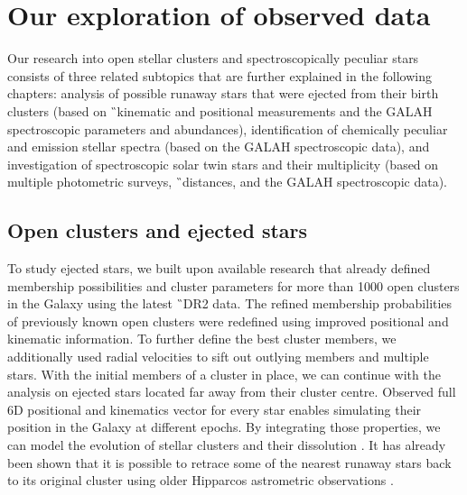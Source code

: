 \section{Our exploration of observed data}
Our research into open stellar clusters and spectroscopically peculiar stars consists of three related subtopics that are further explained in the following chapters: analysis of possible runaway stars that were ejected from their birth clusters (based on \G\ kinematic and positional measurements and the GALAH spectroscopic parameters and abundances), identification of chemically peculiar and emission stellar spectra (based on the GALAH spectroscopic data), and investigation of spectroscopic solar twin stars and their multiplicity (based on multiple photometric surveys, \G\ distances, and the GALAH spectroscopic data).


\subsection{Open clusters and ejected stars}
To study ejected stars, we built upon available research that already defined membership possibilities and cluster parameters for more than 1000 open clusters in the Galaxy \cite{2018A&A...618A..93C} using the latest \G\ DR2 data. The refined membership probabilities of previously known open clusters \cite{2013A&A...558A..53K} were redefined using improved positional and kinematic information. To further define the best cluster members, we additionally used radial velocities to sift out outlying members and multiple stars. With the initial members of a cluster in place, we can continue with the analysis on ejected stars located far away from their cluster centre. Observed full 6D positional and kinematics vector for every star enables simulating their position in the Galaxy at different epochs. By integrating those properties, we can model the evolution of stellar clusters and their dissolution \cite{1998A&A...337..363P}. It has already been shown that it is possible to retrace some of the nearest runaway stars back to its original cluster using older Hipparcos astrometric observations \cite{2000ApJ...544L.133H}.

